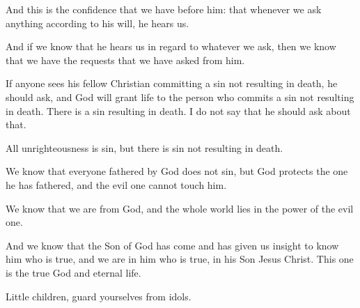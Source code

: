\begin{scripture}
 And this is the confidence that we have before him: that whenever we ask anything according to his will, he hears us.
 And if we know that he hears us in regard to whatever we ask, then we know that we have the requests that we have asked from him.
 If anyone sees his fellow Christian committing a sin not resulting in death, he should ask, and God will grant life to the person who commits a sin not resulting in death. There is a sin resulting in death. I do not say that he should ask about that.
 All unrighteousness is sin, but there is sin not resulting in death.
\everypar{}

 We know that everyone fathered by God does not sin, but God protects the one he has fathered, and the evil one cannot touch him.
 We know that we are from God, and the whole world lies in the power of the evil one.
 And we know that the Son of God has come and has given us insight to know him who is true, and we are in him who is true, in his Son Jesus Christ. This one is the true God and eternal life.
 Little children, guard yourselves from idols.

\end{scripture}
